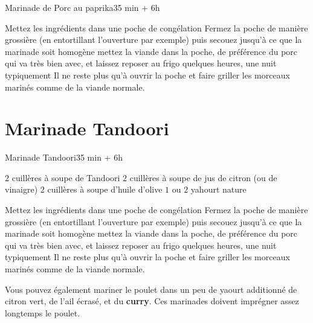{\begin{recette}{Marinade de Porc au paprika}{3}{5 min + 6h}{}
\begin{preparation}
\etape Mettez les ingrédients dans une poche de congélation
\etape Fermez la poche de manière grossière (en entortillant l'ouverture par exemple) puis secouez jusqu'à ce que la marinade 
soit homogène
\etape mettez la viande dans la poche, de préférence du porc qui va très bien avec, et laissez reposer au frigo quelques heures, 
une nuit typiquement
\etape Il ne reste plus qu'à ouvrir la poche et faire griller les morceaux marinés comme de la viande normale.
\end{preparation}

\end{recette}

\section{Marinade Tandoori}
\begin{recette}{Marinade Tandoori}{3}{5 min + 6h}{}
\begin{ingredients}
\ingredient $2$ cuillères à soupe de Tandoori
\ingredient $2$ cuillères à soupe de jus de citron (ou de vinaigre)
\ingredient $2$ cuillères à soupe d'huile d'olive
\ingredient $1$ ou $2$ yahourt nature
\end{ingredients}

\begin{preparation}
\etape Mettez les ingrédients dans une poche de congélation
\etape Fermez la poche de manière grossière (en entortillant l'ouverture par exemple) puis secouez jusqu'à ce que la marinade 
soit homogène
\etape mettez la viande dans la poche, de préférence du porc qui va très bien avec, et laissez reposer au frigo quelques heures, 
une nuit typiquement
\etape Il ne reste plus qu'à ouvrir la poche et faire griller les morceaux marinés comme de la viande normale.
\end{preparation}

\begin{remarque}
Vous pouvez également mariner le poulet dans un peu de yaourt additionné de citron vert, de l'ail écrasé, et du \textbf{curry}. 
Ces marinades doivent imprégner assez longtemps le poulet.
\end{remarque}

\end{recette}

}
